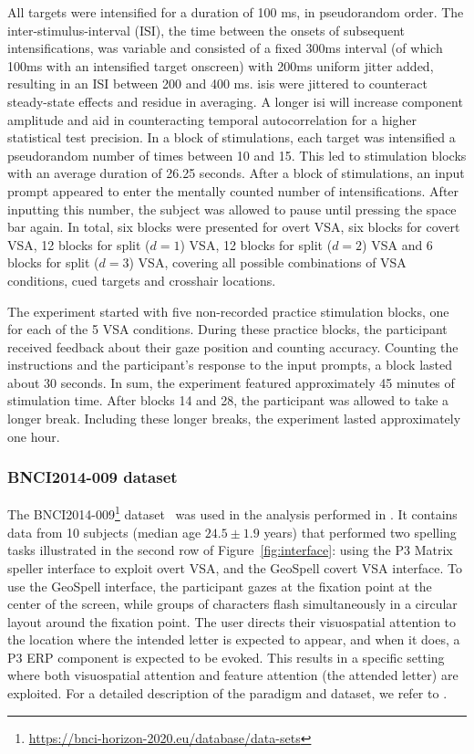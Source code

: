All targets were intensified for a duration of 100 ms, in pseudorandom order.
The inter-stimulus-interval (ISI), the time between the onsets of subsequent intensifications,
was variable and consisted of a fixed 300ms interval (of which 100ms with an intensified target onscreen)
with 200ms uniform jitter added, resulting in an ISI
between 200 and 400 ms.
\Acp{isi} were jittered to counteract steady-state effects and residue in averaging. A
longer \ac{isi} will increase component amplitude and aid in counteracting temporal
autocorrelation for a higher statistical test precision.
In a block of stimulations, each target was intensified a pseudorandom number of times between 10 and 15.
This led to stimulation blocks with an average duration of 26.25 seconds. After a block of stimulations, an
input prompt appeared to enter the mentally counted number of intensifications.
After inputting this number, the subject was allowed to pause until pressing the space bar again.
In total, six blocks were presented for overt VSA, six blocks for covert VSA, 12 blocks for
split ($d=1$) VSA, 12 blocks for split ($d=2$) VSA and 6 blocks for split
($d=3$) VSA, covering all possible combinations of VSA conditions, cued targets and
crosshair locations.

The experiment started with five non-recorded practice stimulation blocks, one for
each of the 5 VSA conditions.
During these practice blocks, the participant received feedback about their gaze
position and counting accuracy.
Counting the instructions and the participant's response to the
input prompts, a block lasted about 30
seconds. In sum, the experiment featured approximately 45 minutes of
stimulation time.
After blocks 14 and 28, the participant was allowed to take a longer break.
Including these longer breaks, the experiment lasted approximately one hour.

\subsubsection{BNCI2014-009 dataset}
The
BNCI2014-009\footnote{\url{https://bnci-horizon-2020.eu/database/data-sets}}
dataset~\cite{Aloise2012a} was used in the analysis performed
in \cite{Arico2014}.
It contains data from 10 subjects (median age $24.5\pm1.9$
years)  that performed two spelling tasks illustrated in the second row of
Figure~\ref{fig:interface}: using the P3 Matrix speller
interface to exploit overt VSA, and the GeoSpell covert VSA interface.
To use the GeoSpell interface, the participant gazes at the fixation point at the
center of the screen, while groups of characters flash simultaneously in a
circular layout around the fixation point.
The user directs their visuospatial attention to the location where the intended letter is expected
to appear, and when it does, a P3 ERP component is expected to be evoked.
This results in a specific setting where both visuospatial attention and
feature attention (the attended letter) are exploited.
For a detailed description of the paradigm and dataset, we refer
to \cite{Aloise2012a}.

